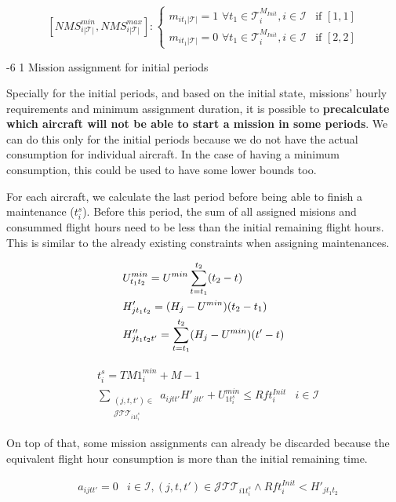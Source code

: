 \documentclass[a4paper,onecolumn,fleqn]{article}
\makeatletter
\renewcommand\section{\@startsection{section}{1}{\z@}%
                       {-6\p@ \@plus -0\p@ \@minus -0\p@}%
                       {2\p@ \@plus 0\p@ \@minus 0\p@}%
                       {\normalsize\textbf}}
\renewcommand\section{\@startsection{section}{2}{\z@}%
                       {-6\p@ \@plus -0\p@ \@minus -0\p@}%
                       {2\p@ \@plus 0\p@ \@minus 0\p@}%
                       {\normalsize\textbf}}
\renewcommand\section{\@startsection{section}{3}{\z@}%
                       {-6\p@ \@plus -0\p@ \@minus -0\p@}%
                       {1\p@ \@plus 0\p@ \@minus 0\p@}%
                       {\normalsize\itshape\bfseries}}
\makeatother
\begin{document}
\[
[NMS^{min}_{i|\mathcal{T}|}, NMS^{max}_{i|\mathcal{T}|}] :
  \begin{cases} 
   m_{it_1|\mathcal{T}|} =  1
    \,\, \forall t_1 \in \mathcal{T}^{M_{Init}}_i, i \in \mathcal{I} & \text{if } [1, 1] \\
   m_{it_1|\mathcal{T}|} =  0 \,\, \forall t_1 \in \mathcal{T}^{M_{Init}}_i, i \in \mathcal{I} & \text{if } [2, 2] 
  \end{cases}
\]

\section{Mission assignment for initial periods}
\label{mission-assignment-for-initial-periods}

Specially for the initial periods, and based on the initial state, missions' hourly requirements and minimum assignment duration, it is possible to \textbf{precalculate which aircraft will not be able to start a mission in some periods}. We can do this only for the initial periods because we do not have the actual consumption for individual aircraft.  In the case of having a minimum consumption, this could be used to have some lower bounds too. 

For each aircraft, we calculate the last period before being able to finish a maintenance ($t^{s}_i$). Before this period, the sum of all assigned misions and consummed flight hours need to be less than the initial remaining flight hours. This is similar to the already existing constraints when assigning maintenances.


\begin{align}
    & U^{min}_{t_1t_2} = U^{min} \sum_{t=t_1}^{t_2} (t_2 - t) \notag \\
    & H'_{jt_1t_2} = (H_j - U^{min}) (t_2 - t_1) \notag \\
    & H''_{jt_1t_2t'} = \sum_{t=t_1}^{t_2} (H_j- U^{min}) (t' - t) \notag
\end{align}



\begin{align}
  & t^{s}_i = TM1^{min}_i + M - 1&  \\
  & \sum_{\substack{(j, t, t') \in \\ \mathcal{J}\mathcal{T}\mathcal{T}_{i1t^{s}_i}}} a_{ijtt'} H'_{jtt'} + U^{min}_{1t^{s}_i} \leq Rft^{Init}_i
                  & i \in \mathcal{I}
\end{align}

On top of that, some mission assignments can already be discarded because the equivalent flight hour consumption is more than the initial remaining time.

\begin{align}
  & a_{ijtt'} = 0 & i \in \mathcal{I}, (j, t, t') \in \mathcal{J}\mathcal{T}\mathcal{T}_{i1t^{s}_i} \land Rft^{Init}_i < H'_{jt_1t_2}
\end{align}
\end{document}
